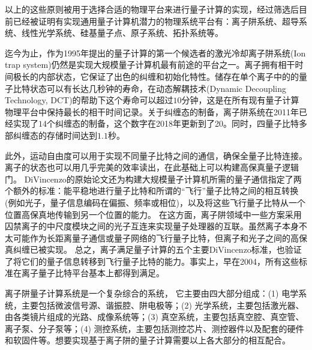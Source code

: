 以上的这些原则被用于选择合适的物理平台来进行量子计算的实现，经过筛选后目前已经被证明有实现通用量子计算机潜力的物理系统平台有：离子阱系统、超导系统、线性光学系统、硅基量子点、原子系统、拓扑系统等。

迄今为止，作为1995年提出的量子计算的第一个候选者的激光冷却离子阱系统(Ion trap system)仍然是实现大规模量子计算机最有前途的平台之一。离子拥有相干时间极长\cite[]{Fisk_Sellars_Lawn_Coles_1997}的内部状态，它保证了出色的纠缠和初始化特性\cite[]{Blatt_Wineland_2008}。储存在单个离子中的的量子比特状态可以有长达几秒钟的寿命\cite[]{Langer_Ozeri_Jost_Chiaverini_DeMarco_Ben_Kish_Blakestad_Britton_Hume_Itano_et_al_2005}，在动态解耦技术(Dynamic Decoupling Technology, DCT)的帮助下这个寿命可以超过$10$分钟\cite[]{Wang_Um_Zhang_An_Lyu_Zhang_Duan_Yum_Kim_2017}，这是在所有现有量子计算物理平台中保持最长的相干时间记录。关于纠缠态的制备，离子阱系统在2011年已经实现了$14$个纠缠态的制备\cite[]{Monz_Schindler_Barreiro_Chwalla_Nigg_Coish_Harlander_Hänsel_Hennrich_Blatt_2011}，这个数字在2018年更新到了20\cite[]{Friis_Marty_Maier_Hempel_Holzäpfel_Jurcevic_Plenio_Huber_Roos_Blatt_et_al_2018}。同时，四量子比特多部纠缠态的存储时间达到$1.1$秒\cite[]{Kaufmann_Ruster_Schmiegelow_Luda_Kaushal_Schulz_von_Lindenfels_Schmidt_Kaler_Poschinger_2017}。

此外，运动自由度可以用于实现不同量子比特之间的通信，确保全量子比特连接\cite[]{Debnath_Linke_Figgatt_Landsman_Wright_Monroe_2016}。离子的状态也可以用几乎完美的效率读出\cite[]{Myerson_Szwer_Webster_Allcock_Curtis_Imreh_Sherman_Stacey_Steane_Lucas_2008}，在此基础上可以构建高保真量子逻辑门\cite[]{Ballance_Harty_Linke_Sepiol_Lucas_2016}。
DiVincenzo的原始论文还为构建大规模量子计算机所需的量子通信指定了两个额外的标准：能平稳地进行量子比特和所谓的“飞行”量子比特之间的相互转换(例如光子，量子信息编码在偏振、频率或相位)，以及将这些飞行量子比特从一个位置高保真地传输到另一个位置的能力。
在这方面，离子阱领域中一些方案采用囚禁离子的中尺度模块之间的光子互连来实现量子处理器的互联\cite[]{Monroe_Raussendorf_Ruthven_Brown_Maunz_Duan_Kim_2014}。虽然离子本身不太可能作为长距离量子通信或量子网络的飞行量子比特，但离子和光子之间的高保真纠缠已被实现\cite[]{Moehring_Blinov_Madsen_Duan_Monroe_2004}。
总之，离子满足量子计算的五个主要DiVincenzo标准，也验证了将它们的量子信息转移到飞行量子比特的能力。事实上，早在2004，所有这些标准在离子量子比特平台基本上都得到满足\cite[]{Leibfried_DeMarco_Meyer_Lucas_Barrett_Britton_Itano_Jelenković_Langer_Rosenband_et_al_2003,Moehring_Blinov_Madsen_Duan_Monroe_2004}。

离子阱量子计算系统是一个复杂综合的系统，
它主要由四大部分组成：(1) 电学系统，主要包括微波信号源、谐振腔、阱电极等；(2) 光学系统，主要包括激光器、由各类镜片组成的光路、成像系统等；(3) 真空系统，主要包括真空腔、真空管、离子泵、分子泵等；(4) 测控系统，主要包括测控芯片、测控器件以及配套的硬件和软固件等。想要实现基于离子阱的量子计算需要以上各大部分的相互配合。

